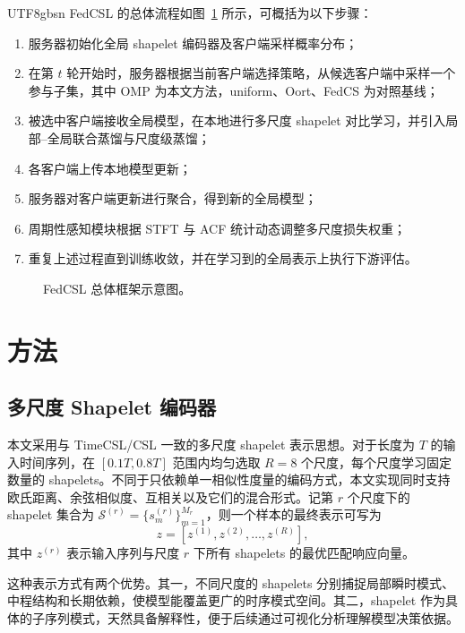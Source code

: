 \documentclass{article}
\begin{document}
\begin{CJK*}{UTF8}{gbsn}
FedCSL 的总体流程如图~\ref{fig:framework} 所示，可概括为以下步骤：
\begin{enumerate}[leftmargin=2.5em]
    \item 服务器初始化全局 shapelet 编码器及客户端采样概率分布；
    \item 在第 $t$ 轮开始时，服务器根据当前客户端选择策略，从候选客户端中采样一个参与子集，其中 OMP 为本文方法，uniform、Oort、FedCS 为对照基线；
    \item 被选中客户端接收全局模型，在本地进行多尺度 shapelet 对比学习，并引入局部--全局联合蒸馏与尺度级蒸馏；
    \item 各客户端上传本地模型更新；
    \item 服务器对客户端更新进行聚合，得到新的全局模型；
    \item 周期性感知模块根据 STFT 与 ACF 统计动态调整多尺度损失权重；
    \item 重复上述过程直到训练收敛，并在学习到的全局表示上执行下游评估。
\end{enumerate}

\begin{figure}[H]
    \centering
    \caption{FedCSL 总体框架示意图。}
    \label{fig:framework}
\end{figure}

\section{方法}

\subsection{多尺度 Shapelet 编码器}

本文采用与 TimeCSL/CSL 一致的多尺度 shapelet 表示思想。对于长度为 $T$ 的输入时间序列，在 $\left[0.1T,0.8T\right]$ 范围内均匀选取 $R=8$ 个尺度，每个尺度学习固定数量的 shapelets。不同于只依赖单一相似性度量的编码方式，本文实现同时支持欧氏距离、余弦相似度、互相关以及它们的混合形式。记第 $r$ 个尺度下的 shapelet 集合为 $\mathcal{S}^{(r)}=\{s_m^{(r)}\}_{m=1}^{M_r}$，则一个样本的最终表示可写为
\begin{equation}
z = \left[z^{(1)},z^{(2)},\dots,z^{(R)}\right],
\end{equation}
其中 $z^{(r)}$ 表示输入序列与尺度 $r$ 下所有 shapelets 的最优匹配响应向量。

这种表示方式有两个优势。其一，不同尺度的 shapelets 分别捕捉局部瞬时模式、中程结构和长期依赖，使模型能覆盖更广的时序模式空间。其二，shapelet 作为具体的子序列模式，天然具备解释性，便于后续通过可视化分析理解模型决策依据。


\end{CJK*}
\end{document}
